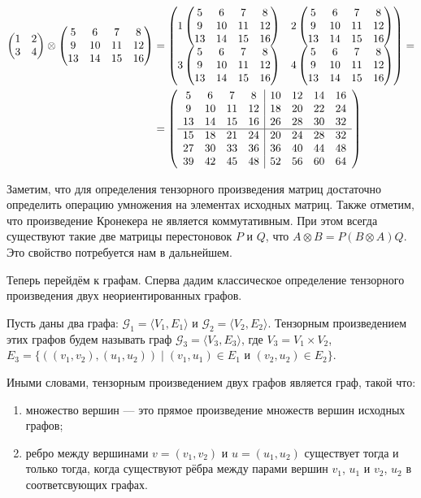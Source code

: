 \begin{example}
\begin{align}
\begin{pmatrix}
1 & 2 \\
3 & 4
\end{pmatrix}
\otimes
\begin{pmatrix} 5 & 6 & 7 & 8 \\ 9 & 10 & 11 & 12 \\ 13 & 14 & 15 & 16 \end{pmatrix} &=
\begin{pmatrix}
1\begin{pmatrix} 5 & 6 & 7 & 8 \\ 9 & 10 & 11 & 12 \\ 13 & 14 & 15 & 16 \end{pmatrix} & 2\begin{pmatrix} 5 & 6 & 7 & 8 \\ 9 & 10 & 11 & 12 \\ 13 & 14 & 15 & 16 \end{pmatrix} \\
3\begin{pmatrix} 5 & 6 & 7 & 8 \\ 9 & 10 & 11 & 12 \\ 13 & 14 & 15 & 16 \end{pmatrix} & 4\begin{pmatrix} 5 & 6 & 7 & 8 \\ 9 & 10 & 11 & 12 \\ 13 & 14 & 15 & 16 \end{pmatrix}
\end{pmatrix}
=\notag \\
&=
\left(\begin{array}{c c c c | c c c c}
5  & 6  & 7  & 8  & 10 & 12 & 14 & 16 \\
9  & 10 & 11 & 12 & 18 & 20 & 22 & 24 \\
13 & 14 & 15 & 16 & 26 & 28 & 30 & 32 \\
\hline
15 & 18 & 21 & 24 & 20 & 24 & 28 & 32 \\
27 & 30 & 33 & 36 & 36 & 40 & 44 & 48 \\
39 & 42 & 45 & 48 & 52 & 56 & 60 & 64 
\end{array}\right)
\end{align}
\end{example}

Заметим, что для определения тензорного произведения матриц достаточно определить операцию умножения на элементах исходных матриц.
Также отметим, что произведение Кронекера не является коммутативным.
При этом всегда существуют такие две матрицы перестоновок $P$ и $Q$, что $A \otimes B = P(B \otimes A)Q$.
Это свойство потребуется нам в дальнейшем.

Теперь перейдём к графам.
Сперва дадим классическое определение тензорного произведения двух неориентированных графов.

\begin{definition}
Пусть даны два графа: $\mathcal{G}_1 = \langle V_1, E_1\rangle$ и $\mathcal{G}_2 = \langle V_2, E_2\rangle$. 
Тензорным произведением этих графов будем называть граф $\mathcal{G}_3 = \langle V_3, E_3\rangle$, где $V_3 = V_1 \times V_2$, $E_3 = \{ ((v_1,v_2),(u_1,u_2)) \mid (v_1,u_1) \in E_1 \text{ и } (v_2,u_2) \in E_2 \}$.
\end{definition}

Иными словами, тензорным произведением двух графов является граф, такой что:
\begin{enumerate}
 \item множество вершин --- это прямое произведение множеств вершин исходных графов;
 \item ребро между вершинами $v=(v_1,v_2)$ и $u=(u_1,u_2)$ существует тогда и только тогда, когда существуют рёбра между парами вершин $v_1$, $u_1$ и $v_2$, $u_2$ в соответсвующих графах. 
\end{enumerate}

